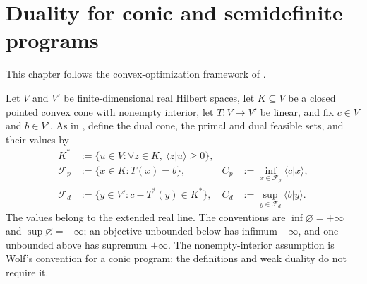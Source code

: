 \chapter{Duality for conic and semidefinite programs}\label{ch:convex_structure}

This chapter follows the convex-optimization framework of
\cite[Chapter~4]{Wolf2012Quantum}.

\begin{definition}
    \label{def:conic_programs}
    \leanok
    Let $V$ and $V'$ be finite-dimensional real Hilbert spaces, let
    $K\subseteq V$ be a closed pointed convex cone with nonempty interior, let
    $T:V\to V'$ be linear, and fix $c\in V$ and $b\in V'$.  As in
    \cite[Chapter~4, equations~(4.1)--(4.2)]{Wolf2012Quantum}, define the dual
    cone, the primal and dual feasible sets, and their values by
    \begin{align}
        K^*
         & :=\{u\in V:\forall z\in K,\ \langle z|u\rangle\geq0\},
        \label{eq:conic_dual_cone}                                                                               \\
        \mathcal F_p
         & :=\{x\in K:T(x)=b\},
         & C_p                                                    & :=\inf_{x\in\mathcal F_p}\langle c|x\rangle,
        \label{eq:conic_primal}                                                                                  \\
        \mathcal F_d
         & :=\{y\in V':c-T^*(y)\in K^*\},
         & C_d                                                    & :=\sup_{y\in\mathcal F_d}\langle b|y\rangle.
        \label{eq:conic_dual}
    \end{align}
    The values belong to the extended real line.  The conventions are
    $\inf\varnothing=+\infty$ and $\sup\varnothing=-\infty$; an objective
    unbounded below has infimum $-\infty$, and one unbounded above has
    supremum $+\infty$.  The nonempty-interior assumption is Wolf's
    convention for a conic program; the definitions and weak duality do not
    require it.
\end{definition}


